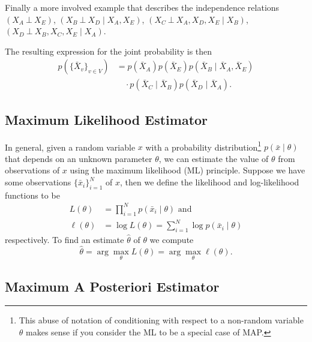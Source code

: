 \documentclass[a4paper]{article}
\newcommand{\given}{\mid}
\newcommand{\ind}{~\bot~} %
\theoremstyle{plain}
\theoremstyle{definition}
\theoremstyle{remark}
\begin{document}
Finally a more involved example that describes the independence relations
$(X_A \ind X_E)$, $(X_B \ind X_D \given X_A, X_E)$, $(X_C \ind X_A, X_D, X_E
\given X_B)$, $(X_D \ind X_B, X_C, X_E \given X_A)$.

\begin{center}
\end{center}
The resulting expression for the joint probability is then
\begin{align*}
  p(\{\bar{X}_v\}_{v\in V}) &= 
    p(\bar{X}_A) p(\bar{X}_E) p(\bar{X}_B \given \bar{X}_A, \bar{X}_E) \\
    &\quad\cdot p(\bar{X}_C \given \bar{X}_B) p(\bar{X}_D \given \bar{X}_A).
\end{align*}

\subsection{Maximum Likelihood Estimator}

In general, given a random variable $x$ with a probability
distribution\footnote{This abuse of notation of conditioning with respect to a
non-random variable $\theta$ makes sense if you consider the ML to be a
special case of MAP.} $p(\bar{x} \given \theta)$ that depends on an unknown
parameter $\theta$, we can estimate the value of $\theta$ from observations of
$x$ using the maximum likelihood (ML) principle. Suppose we have some observations
$\{\bar{x}_i\}_{i=1}^N$ of $x$, then we define the likelihood and
log-likelihood functions to be
\begin{align*}
  L(\theta) &= \prod_{i=1}^N p(\bar{x}_i \given \theta) \text{ and}\\
  \ell(\theta) &= \log L(\theta) = \sum_{i=1}^N \log p(\bar{x}_i \given \theta)
\end{align*}
respectively. To find an estimate $\hat{\theta}$ of $\theta$ we compute
\[
  \hat{\theta} = \arg\max_\theta L(\theta) = \arg\max_\theta \ell(\theta).
\]

\subsection{Maximum A Posteriori Estimator}
\end{document}
